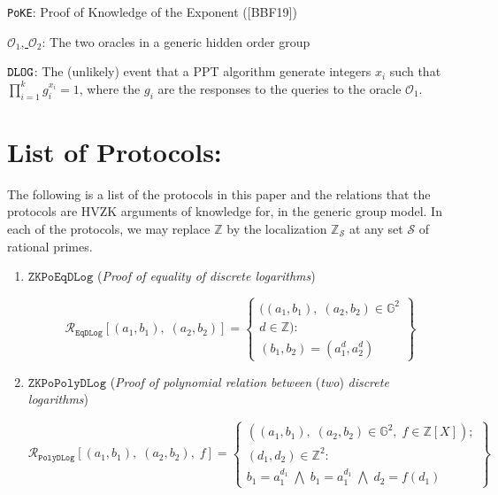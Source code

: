 \documentclass[11pt, lettersize, notitlepage, leqno, footskip=0.6cm]{article}
\newcommand{\bz}{\mathbb Z}
\newcommand{\ttt}{\texttt}
\newcommand{\mc}{\mathcal}
\newcommand{\mb}{\mathbb}
\newcommand{\noin}{\noindent}
\numberwithin{equation}{section}
\begin{document}
{{{\noin \verb|PoKE|: Proof of Knowledge of the Exponent ([BBF19]) \vspace{0.1cm}

\noin \hyperlink{Oracles}{$\mc{O}_1$, $\mc{O}_2$}: The two oracles in a generic hidden order group \vspace{0.1cm}

\noin \hyperlink{DLOG}{$\tt{DLOG}$}: The (unlikely) event that a PPT algorithm generate integers $x_i$ such that $\prod_{i=1}^k g_i^{x_i} = 1$, where the $g_i$ are the responses to the queries to the oracle $\mc{O}_1.$

\section{\fontsize{11}{11}\selectfont List of Protocols:}

\hypertarget{List}{The following is a list of the protocols in this paper and the relations that the protocols are HVZK arguments of knowledge for, in the generic group model. In each of the protocols, we may replace $\bz$ by the localization $\bz_{\mc{S}}$ at any set $\mc{S}$ of rational primes.}

\begin{enumerate}[wide, labelwidth=!, labelindent=0pt]

\item $\ttt{ZKPoEqDLog}$ (\textit{Proof of equality of discrete logarithms}) \vspace{-0.3cm}

\[
  \mc{R}_{{\ttt{EqDLog}}}[(a_1, b_1),\;(a_2,b_2)] = \left\{\begin{array}{l}
    ((a_1, b_1), \; (a_2,b_2)\in\mb{G}^2\\
    d\in\mb{Z}): \\
    (b_1,b_2) = (a_1^d,a_2^d)
  \end{array}\right\}
\]

 

\item $\ttt{ZKPoPolyDLog}$ (\textit{Proof of polynomial relation between} (\textit{two}) \textit{discrete logarithms})\vspace{-0.3cm}

\[
  \mc{R}_{{\ttt{PolyDLog}}}[(a_1, b_1),\;(a_2,b_2),\;f] = \left\{\begin{array}{l}
    ((a_1, b_1), \; (a_2,b_2)\in\mb{G}^2,\;f\in\bz[X]);\\
    (d_1, d_2)\in\mb{Z}^2: \\
    b_1 = a_1^{d_1}\; \bigwedge\; b_1 = a_1^{d_1}\; \bigwedge \;d_2 = f(d_1)
  \end{array}\right\}
\]


\end{enumerate}}}}
\end{document}
